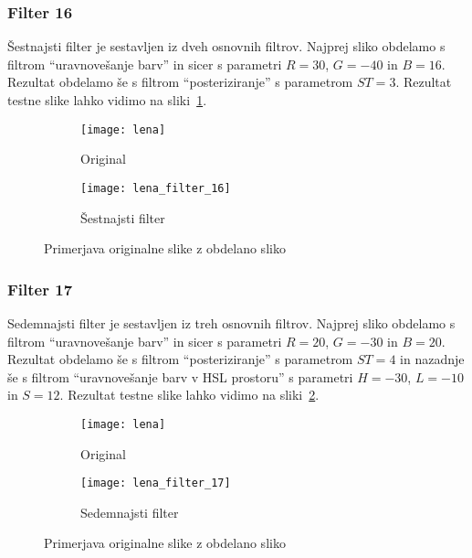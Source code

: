 \subsubsection*{Filter 16}
Šestnajsti filter je sestavljen iz dveh osnovnih filtrov. Najprej sliko obdelamo s
filtrom ``uravnovešanje barv'' in sicer s parametri $R = 30$, $G = -40$ in
$B = 16$. Rezultat obdelamo še s filtrom ``posteriziranje'' s parametrom
$ST =3$. Rezultat testne slike lahko vidimo na sliki~\ref{fig:lena_filter_16}.

\begin{figure}[!ht]
    \centering
    \begin{subfigure}[b]{0.4\textwidth}
        \texttt{[image: lena]}
        \caption{Original}
    \end{subfigure}
    \begin{subfigure}[b]{0.4\textwidth}
        \texttt{[image: lena\_filter\_16]}
        \caption{Šestnajsti filter}
    \end{subfigure}
    \caption{Primerjava originalne slike z obdelano sliko}
    \label{fig:lena_filter_16}
\end{figure}


\subsubsection*{Filter 17}
Sedemnajsti filter je sestavljen iz treh osnovnih filtrov. Najprej sliko obdelamo s
filtrom ``uravnovešanje barv'' in sicer s parametri $R = 20$, $G = -30$ in
$B = 20$. Rezultat obdelamo še s filtrom ``posteriziranje'' s parametrom
$ST= 4$ in nazadnje še s filtrom ``uravnovešanje barv v HSL prostoru'' s
parametri $H = -30$, $L = -10$ in $S = 12$. Rezultat testne slike lahko
vidimo na sliki~\ref{fig:lena_filter_17}.

\begin{figure}[!ht]
    \centering
    \begin{subfigure}[b]{0.4\textwidth}
        \texttt{[image: lena]}
        \caption{Original}
    \end{subfigure}
    \begin{subfigure}[b]{0.4\textwidth}
        \texttt{[image: lena\_filter\_17]}
        \caption{Sedemnajsti filter}
    \end{subfigure}
    \caption{Primerjava originalne slike z obdelano sliko}
    \label{fig:lena_filter_17}
\end{figure}


